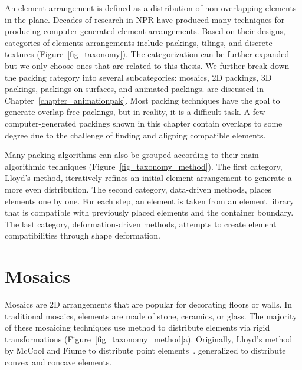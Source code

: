 \newtext
{
An element arrangement is defined as a distribution of non-overlapping elements in the plane.
Decades of research in NPR have produced many techniques for producing computer-generated element arrangements.
Based on their designs, categories of elements arrangements include
packings, tilings, and discrete textures (Figure~\ref{fig_taxonomy}).
The categorization can be further expanded but we only choose ones that are related to this thesis.
We further break down the packing category into several subcategories: mosaics, 2D packings, 3D packings, 
packings on surfaces, and animated packings.
 are discussed in Chapter~\ref{chapter_animationpak}. 
Most packing techniques have the goal to generate overlap-free packings, but in reality, it is a difficult task.
A few computer-generated packings shown in this chapter 
contain overlaps to some degree due to the challenge of finding and aligning compatible elements.
}

\newtext
{
\nnewtext
{Many packing algorithms can also be grouped according to their main algorithmic techniques} (Figure~\ref{fig_taxonomy_method}).
The first category, Lloyd's method, iteratively refines an initial element arrangement to generate a more even distribution.
The second category, data-driven methods, places elements one by one. For each step,
an element is taken from an element library that is compatible with previously placed elements and the container boundary.
The last category, deformation-driven methods, attempts to create element compatibilities through shape deformation.
}

\section{Mosaics}
\newtext
{
Mosaics are 2D arrangements that are popular for decorating floors or walls.
In traditional mosaics, elements are made of stone, ceramics, or glass.
The majority of these mosaicing techniques use  method to distribute elements
via rigid transformations (Figure~\ref{fig_taxonomy_method}a).
Originally, Lloyd's method  by \mbox{McCool} and Fiume to distribute point elements~\cite{McCool1992}.
 generalized to distribute convex and concave elements.
}

